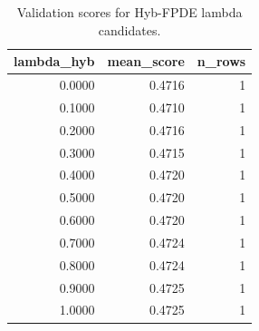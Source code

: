 \begin{table}[t]
\caption{Validation scores for Hyb-FPDE lambda candidates.}
\label{tab:lambda_distribution_computed}
\centering
\begin{tabular}{rrr}
\toprule
lambda\_hyb & mean\_score & n\_rows \\
\midrule
0.0000 & 0.4716 & 1 \\
0.1000 & 0.4710 & 1 \\
0.2000 & 0.4716 & 1 \\
0.3000 & 0.4715 & 1 \\
0.4000 & 0.4720 & 1 \\
0.5000 & 0.4720 & 1 \\
0.6000 & 0.4720 & 1 \\
0.7000 & 0.4724 & 1 \\
0.8000 & 0.4724 & 1 \\
0.9000 & 0.4725 & 1 \\
1.0000 & 0.4725 & 1 \\
\bottomrule
\end{tabular}

\end{table}
